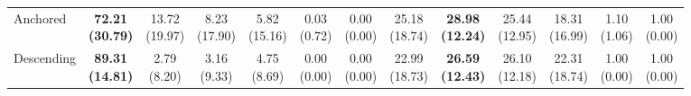{\begin{tabular}{l|cccccc|cccccc}
Anchored & {\cellcolor[HTML]{C8E6C9}} \bfseries \makecell{72.21 \\ (30.79)} & \makecell{13.72 \\ (19.97)} & \makecell{8.23 \\ (17.90)} & \makecell{5.82 \\ (15.16)} & \makecell{0.03 \\ (0.72)} & \makecell{0.00 \\ (0.00)} & {\cellcolor[HTML]{C8E6C9}} \makecell{25.18 \\ (18.74)} & \bfseries \makecell{28.98 \\ (12.24)} & \makecell{25.44 \\ (12.95)} & \makecell{18.31 \\ (16.99)} & \makecell{1.10 \\ (1.06)} & \makecell{1.00 \\ (0.00)} \\
Descending & {\cellcolor[HTML]{C8E6C9}} \bfseries \makecell{89.31 \\ (14.81)} & \makecell{2.79 \\ (8.20)} & \makecell{3.16 \\ (9.33)} & \makecell{4.75 \\ (8.69)} & \makecell{0.00 \\ (0.00)} & \makecell{0.00 \\ (0.00)} & {\cellcolor[HTML]{C8E6C9}} \makecell{22.99 \\ (18.73)} & \bfseries \makecell{26.59 \\ (12.43)} & \makecell{26.10 \\ (12.18)} & \makecell{22.31 \\ (18.74)} & \makecell{1.00 \\ (0.00)} & \makecell{1.00 \\ (0.00)} \\
\bottomrule
\end{tabular}
}%
